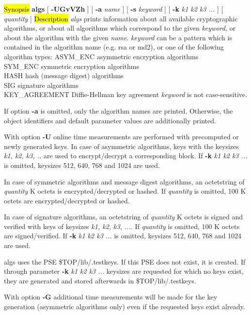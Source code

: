 \label{algs}
\hl{Synopsis}
{\bf algs} [ {\bf -UGvVZh} ] [ {\bf -a} {\em name} ] [ {\bf -s} {\em keyword} ] [ {\bf -k} {\em k1 k2 k3 ...} ] [ {\em quantity} ]
\hl{Description}
{\em algs} prints information about all available cryptographic algorithms, or about all algorithms 
which correspond to the given {\em keyword}, or about the algorithm with the given {\em name}.
{\em keyword} can be a pattern which is contained in the algorithm name (e.g. rsa or md2), or one of the 
following algorithm types:
\bvtab
ASYM\_ENC \4 asymmetric encryption algorithms \\
SYM\_ENC  \4 symmetric encryption algorithms  \\
HASH      \4 hash (message digest) algorithms \\
SIG       \4 signature algorithms  \\
KEY\_AGREEMENT \4 Diffie-Hellman key agreement
\evtab
{\em keyword} is not case-sensitive.

If option {\bf -a} is omitted, only the algorithm names are printed. 
Otherwise, the object identifiers and default parameter values are additionally printed. 

With option {\bf -U} online time measurements are performed with precomputed or newly generated keys. 
In case of asymmetric algorithms, keys with the keysizes {\em k1, k2, k3, ..} are used to 
encrypt/decrypt a corresponding block. If {\bf -k} {\em k1 k2 k3 ...} is omitted, keysizes
512, 640, 768 and 1024 are used.

In case of symmetric algorithms and message digest algorithms, an octetstring of {\em quantity} K
octets is encrypted/decrypted or hashed. If {\em quantity} is omitted, 100 K octets are
encrypted/decrypted or hashed.

In case of signature algorithms, an octetstring of {\em quantity} K octets is signed
and verified with keys of keysizes {\em k1, k2, k3, ...}. If {\em quantity} is omitted, 100 K octets are 
signed/verified. If {\bf -k} {\em k1 k2 k3 ...} is omitted, keysizes 512, 640, 768 and 1024 are used.

algs uses the PSE \$TOP/lib/.testkeys. If this PSE does not exist, it is created. If through
parameter {\bf -k} {\em k1 k2 k3 ...} keysizes are requested for which no keys exist,
they are generated and stored afterwards in \$TOP/lib/.testkeys.

With option {\bf -G} additional time measurements will be made for the key generation (asymmetric 
algorithms only) even if the requested keys exist already.

